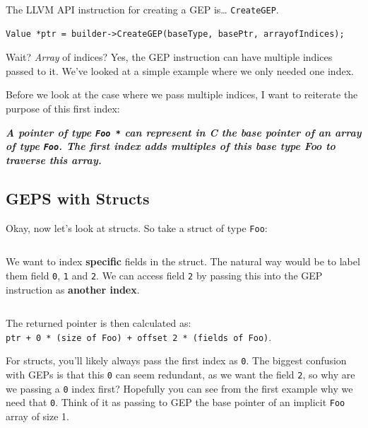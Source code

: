 The LLVM API instruction for creating a GEP is\ldots{}
\texttt{CreateGEP}.


\begin{verbatim}
Value *ptr = builder->CreateGEP(baseType, basePtr, arrayofIndices);
\end{verbatim}

Wait? \emph{Array} of indices? Yes, the GEP instruction can have
multiple indices passed to it. We've looked at a simple example where we
only needed one index.

Before we look at the case where we pass multiple indices, I want to
reiterate the purpose of this first index:

\emph{\textbf{A pointer of type \texttt{Foo\ *} can represent in C the
base pointer of an array of type \texttt{Foo}. The first index adds
multiples of this base type Foo to traverse this array.}}

\hypertarget{geps-with-structs}{%
\subsection{\texorpdfstring{\protect\hyperlink{geps-with-structs}{}GEPS
with Structs}{GEPS with Structs}}\label{geps-with-structs}}

Okay, now let's look at structs. So take a struct of type \texttt{Foo}:


\begin{lstlisting}[language=llvm]
%Foo = type { i32, [4 x i32], i32}
\end{lstlisting}

We want to index \textbf{specific} fields in the struct. The natural way
would be to label them field \texttt{0}, \texttt{1} and \texttt{2}. We
can access field \texttt{2} by passing this into the GEP instruction as
\textbf{another index}.


\begin{lstlisting}[language=llvm]
%ThirdFieldPtr = getelementptr  %Foo, %Foo* %ptr, i64 0, i64 2
\end{lstlisting}

The returned pointer is then calculated as:
\texttt{ptr\ +\ 0\ *\ (size\ of\ Foo)\ +\ offset\ 2\ *\ (fields\ of\ Foo)}.

For structs, you'll likely always pass the first index as \texttt{0}.
The biggest confusion with GEPs is that this \texttt{0} can seem
redundant, as we want the field \texttt{2}, so why are we passing a
\texttt{0} index first? Hopefully you can see from the first example why
we need that \texttt{0}. Think of it as passing to GEP the base pointer
of an implicit \texttt{Foo} array of size 1.


